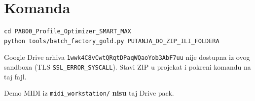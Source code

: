 \documentclass[11pt,a4paper]{article}
\begin{document}
\section{Komanda}
\begin{verbatim}
cd PA800_Profile_Optimizer_SMART_MAX
python tools/batch_factory_gold.py PUTANJA_DO_ZIP_ILI_FOLDERA
\end{verbatim}

Google Drive arhiva \texttt{1wwk4C8vCwtQRqtDPaqWQaoYob3AbF7uu} nije dostupna iz ovog sandboxa
(TLS \texttt{SSL\_ERROR\_SYSCALL}). Stavi ZIP u projekat i pokreni komandu na taj fajl.

Demo MIDI iz \texttt{midi\_workstation/} \textbf{nisu} taj Drive pack.
\end{document}
